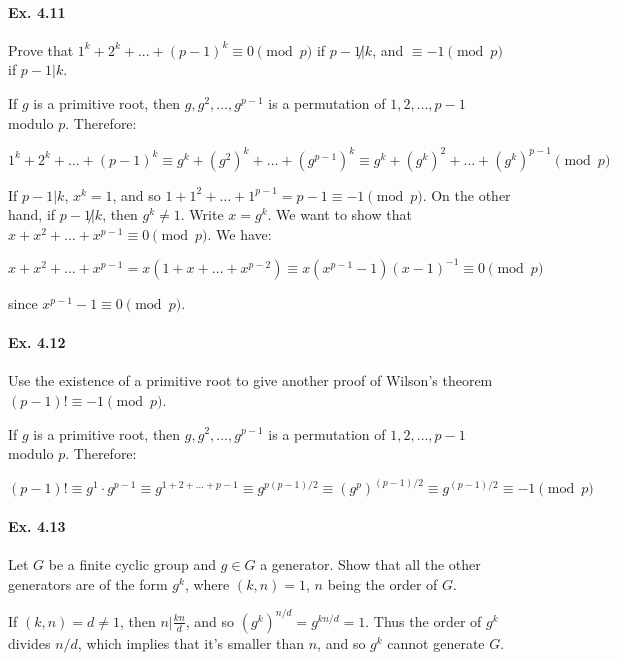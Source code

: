 \documentclass[notitlepage]{article}
\theoremstyle{definition}
\begin{document}
\paragraph{Ex. 4.11}
Prove that $1^k + 2^k + . . . + (p-1)^k \equiv 0 \pmod p$ if $p-1 \not
| k$, and $\equiv -1 \pmod p$ if $p-1 | k$.

If $g$ is a primitive root, then $g, g^2, \ldots, g^{p-1}$ is a
permutation of $1, 2, \ldots, p-1$ modulo $p$. Therefore:

\begin{equation}
  1^k + 2^k + . . . + (p-1)^k \equiv g^k + (g^2)^k + \ldots +
  (g^{p-1})^k \equiv g^k + (g^k)^2 + \ldots + (g^k)^{p-1} \pmod p
\end{equation}

If $p-1|k$, $x^k = 1$, and so $1 + 1^2 + \ldots + 1^{p-1} = p-1 \equiv
-1 \pmod p$. On the other hand, if $p-1 \not | k$, then $g^k \ne
1$. Write $x = g^k$. We want to show that $x + x^2 + \ldots + x^{p-1}
\equiv 0 \pmod p$. We have:

\begin{equation}
x + x^2 + \ldots + x^{p-1} = x(1 + x + \ldots + x^{p-2}) \equiv
x(x^{p-1} - 1)(x-1)^{-1} \equiv 0 \pmod p
\end{equation}

since $x^{p-1} - 1 \equiv 0 \pmod p$.

\paragraph{Ex. 4.12}
Use the existence of a primitive root to give another proof of Wilson's theorem
$(p - 1)! \equiv -1  \pmod p$.

If $g$ is a primitive root, then $g, g^2, \ldots, g^{p-1}$ is a
permutation of $1, 2, \ldots, p-1$ modulo $p$. Therefore:

\begin{equation}
  (p-1)! \equiv g^1 \cdot g^{p-1} \equiv g^{1 + 2 + \ldots + p-1}
  \equiv g^{p(p-1)/2} \equiv (g^p)^{(p-1)/2} \equiv g^{(p-1)/2} \equiv
  -1 \pmod p
\end{equation}


\paragraph{Ex. 4.13}
Let $G$ be a finite cyclic group and $g \in G$ a generator. Show that
all the other generators are of the form $g^k$, where $(k, n) = 1$,
$n$ being the order of $G$.

If $(k, n) = d \ne 1$, then $n | \frac{kn}{d}$, and so $(g^k)^{n/d} = g^{kn/d}
= 1$. Thus the order of $g^k$ divides $n/d$, which implies that it's
smaller than $n$, and so $g^k$ cannot generate $G$.
\end{document}
